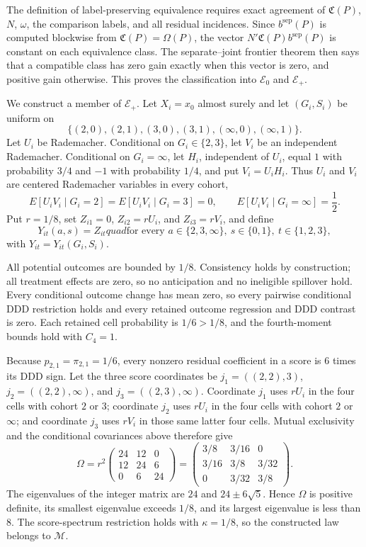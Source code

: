The definition of label-preserving equivalence requires exact agreement of \(\mathfrak C(P)\), \(N\), \(\omega\), the comparison labels, and all residual incidences.  Since \(b^{\mathrm{sep}}(P)\) is computed blockwise from \(\mathfrak C(P)=\Omega(P)\), the vector \(N'\mathfrak C(P)b^{\mathrm{sep}}(P)\) is constant on each equivalence class.  The separate--joint frontier theorem then says that a compatible class has zero gain exactly when this vector is zero, and positive gain otherwise.  This proves the classification into \(\mathscr E_0\) and \(\mathscr E_+\).

We construct a member of \(\mathscr E_+\).  Let \(X_i=x_0\) almost surely and let \((G_i,S_i)\) be uniform on
\[
 \{(2,0),(2,1),(3,0),(3,1),(\infty,0),(\infty,1)\}.
\]
Let \(U_i\) be Rademacher.  Conditional on \(G_i\in\{2,3\}\), let \(V_i\) be an independent Rademacher.  Conditional on \(G_i=\infty\), let \(H_i\), independent of \(U_i\), equal \(1\) with probability \(3/4\) and \(-1\) with probability \(1/4\), and put \(V_i=U_iH_i\).  Thus \(U_i\) and \(V_i\) are centered Rademacher variables in every cohort,
\[
 E[U_iV_i\mid G_i=2]=E[U_iV_i\mid G_i=3]=0,
 \qquad
 E[U_iV_i\mid G_i=\infty]=\frac12.
\]
Put \(r=1/8\), set \(Z_{i1}=0\), \(Z_{i2}=rU_i\), and \(Z_{i3}=rV_i\), and define
\[
 Y_{it}(a,s)=Z_{it}quad\text{for every }a\in\{2,3,\infty\},
 \ s\in\{0,1\},\ t\in\{1,2,3\},
\]
with \(Y_{it}=Y_{it}(G_i,S_i)\).

All potential outcomes are bounded by \(1/8\).  Consistency holds by construction; all treatment effects are zero, so no anticipation and no ineligible spillover hold.  Every conditional outcome change has mean zero, so every pairwise conditional DDD restriction holds and every retained outcome regression and DDD contrast is zero.  Each retained cell probability is \(1/6>1/8\), and the fourth-moment bounds hold with \(C_4=1\).

Because \(p_{2,1}=\pi_{2,1}=1/6\), every nonzero residual coefficient in a score is \(6\) times its DDD sign.  Let the three score coordinates be \(j_1=((2,2),3)\), \(j_2=((2,2),\infty)\), and \(j_3=((2,3),\infty)\).  Coordinate \(j_1\) uses \(rU_i\) in the four cells with cohort \(2\) or \(3\); coordinate \(j_2\) uses \(rU_i\) in the four cells with cohort \(2\) or \(\infty\); and coordinate \(j_3\) uses \(rV_i\) in those same latter four cells.  Mutual exclusivity and the conditional covariances above therefore give
\[
 \Omega=r^2
 \begin{pmatrix}
 24&12&0\\
 12&24&6\\
 0&6&24
 \end{pmatrix}
 =
 \begin{pmatrix}
 3/8&3/16&0\\
 3/16&3/8&3/32\\
 0&3/32&3/8
 \end{pmatrix}.
\]
The eigenvalues of the integer matrix are \(24\) and \(24\pm6\sqrt5\).  Hence \(\Omega\) is positive definite, its smallest eigenvalue exceeds \(1/8\), and its largest eigenvalue is less than \(8\).  The score-spectrum restriction holds with \(\kappa=1/8\), so the constructed law belongs to \(\mathcal M\).

